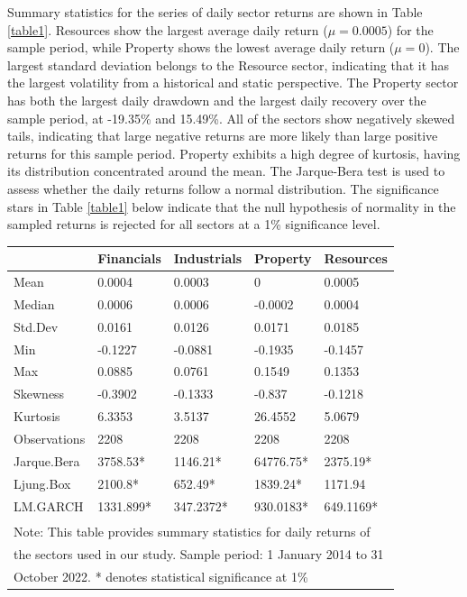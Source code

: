 \documentclass[11pt,preprint, authoryear]{elsarticle}
\let\origtable\table
\let\endorigtable\endtable
\renewenvironment{table}[1][2] {
    \expandafter\origtable\expandafter[H]
} {
    \endorigtable
}
\numberwithin{equation}{section}
\numberwithin{figure}{section}
\numberwithin{table}{section}
\begin{document}
Summary statistics for the series of daily sector returns are shown in
Table \ref{table1}. Resources show the largest average daily return
(\(\mu = 0.0005\)) for the sample period, while Property shows the
lowest average daily return (\(\mu = 0\)). The largest standard
deviation belongs to the Resource sector, indicating that it has the
largest volatility from a historical and static perspective. The
Property sector has both the largest daily drawdown and the largest
daily recovery over the sample period, at -19.35\% and 15.49\%. All of
the sectors show negatively skewed tails, indicating that large negative
returns are more likely than large positive returns for this sample
period. Property exhibits a high degree of kurtosis, having its
distribution concentrated around the mean. The Jarque-Bera test is used
to assess whether the daily returns follow a normal distribution. The
significance stars in Table \ref{table1} below indicate that the null
hypothesis of normality in the sampled returns is rejected for all
sectors at a 1\% significance level.

\begin{table}

\caption{\label{tab:table1}Summary Statistics and Test Scores for Sectors \label{table1}}
\centering
\fontsize{9}{11}\selectfont
\begin{tabular}[t]{l|l|l|l|l}
\hline
  & Financials & Industrials & Property & Resources\\
\hline
Mean & 0.0004 & 0.0003 & 0 & 0.0005\\
\hline
Median & 0.0006 & 0.0006 & -0.0002 & 0.0004\\
\hline
Std.Dev & 0.0161 & 0.0126 & 0.0171 & 0.0185\\
\hline
Min & -0.1227 & -0.0881 & -0.1935 & -0.1457\\
\hline
Max & 0.0885 & 0.0761 & 0.1549 & 0.1353\\
\hline
Skewness & -0.3902 & -0.1333 & -0.837 & -0.1218\\
\hline
Kurtosis & 6.3353 & 3.5137 & 26.4552 & 5.0679\\
\hline
Observations & 2208 & 2208 & 2208 & 2208\\
\hline
Jarque.Bera & 3758.53* & 1146.21* & 64776.75* & 2375.19*\\
\hline
Ljung.Box & 2100.8* & 652.49* & 1839.24* & 1171.94\\
\hline
LM.GARCH & 1331.899* & 347.2372* & 930.0183* & 649.1169*\\
\hline
\multicolumn{5}{l}{\textsuperscript{} Note: This table provides summary statistics for daily returns of}\\
\multicolumn{5}{l}{the sectors used in our study. Sample period: 1 January 2014 to 31}\\
\multicolumn{5}{l}{October 2022. * denotes statistical significance at 1\%}\\
\end{tabular}
\end{table}
\end{document}
